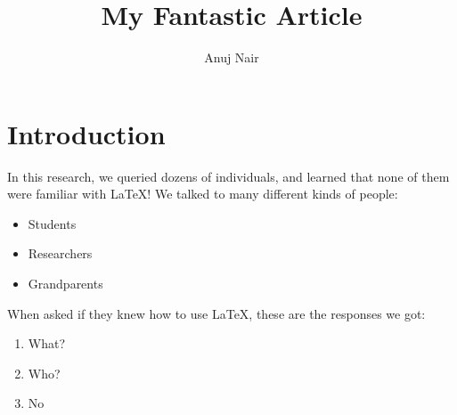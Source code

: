 \documentclass{article}
\title{My Fantastic Article}
\author{Anuj Nair}
\date{}
\begin{document}
\maketitle


\section{Introduction}

In this research, we queried dozens of individuals, and learned that none of them were familiar with \LaTeX! We talked to many different kinds of people:

\begin{itemize}
				\item Students
				\item Researchers
				\item Grandparents
\end{itemize}

\noindent When asked if they knew how to use \LaTeX, these are the responses we got:

\begin{enumerate}
				\item What?
				\item Who?
				\item No
\end{enumerate}
\end{document}
